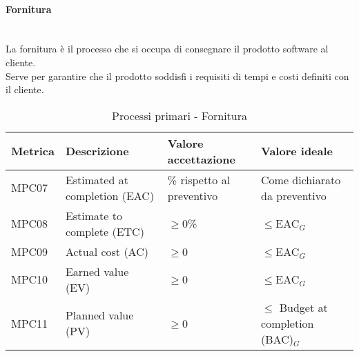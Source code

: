 \documentclass[11pt]{article}
\begin{document}
\begin{justify}
\paragraph{Fornitura}\mbox{}\\
La fornitura è il processo che si occupa di consegnare il prodotto software al cliente.\\
Serve per garantire che il prodotto soddisfi i requisiti di tempi e costi definiti con il cliente.\\
\begin{table}[H]
  \centering
\begin{tabular}{|p{1.5cm}|p{5cm}|p{4cm}|p{5cm}|}
  \hline
  \textbf{Metrica} & \textbf{Descrizione} & \textbf{Valore accettazione} & \textbf{Valore ideale}\\
  \hline
  MPC07 & Estimated at completion (EAC) & \textpm5\% rispetto al preventivo & Come dichiarato da preventivo\\
  \hline
  MPC08 & Estimate to complete (ETC) & $\geq$0\% & $\leq$EAC\(_G\) \\
  \hline
  MPC09 & Actual cost (AC) & $\geq$0 & $\leq$EAC\(_G\) \\
  \hline
  MPC10 & Earned value (EV) & $\geq$0 & $\leq$EAC\(_G\) \\
  \hline
  MPC11 & Planned value (PV) & $\geq$0 & $\leq$ Budget at completion (BAC)\(_G\) \\
  \hline
\end{tabular}
\caption{Processi primari - Fornitura}
\label{tab:fornitura}
\end{table}

\newpage


\end{justify}
\end{document}
